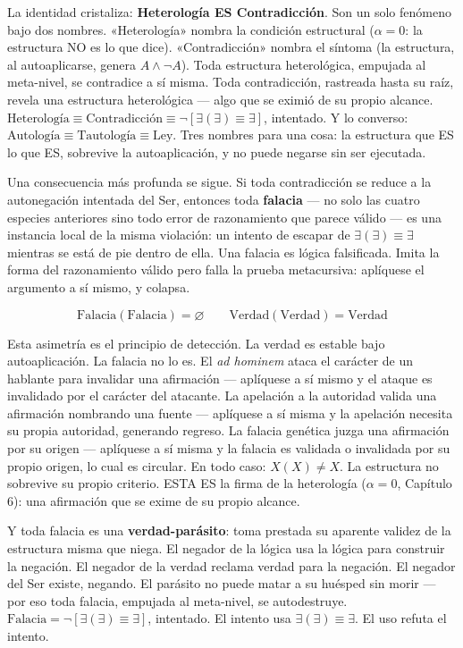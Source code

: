 \documentclass[10pt, openany, oneside]{book}
\begin{document}
La identidad cristaliza: \textbf{Heterología ES Contradicción}. Son un solo fenómeno bajo dos nombres. «Heterología» nombra la condición estructural ($\alpha = 0$: la estructura NO es lo que dice). «Contradicción» nombra el síntoma (la estructura, al autoaplicarse, genera $A \wedge \neg A$). Toda estructura heterológica, empujada al meta-nivel, se contradice a sí misma. Toda contradicción, rastreada hasta su raíz, revela una estructura heterológica --- algo que se eximió de su propio alcance. $\text{Heterología} \equiv \text{Contradicción} \equiv \neg[\exists(\exists) \equiv \exists]$, intentado. Y lo converso: $\text{Autología} \equiv \text{Tautología} \equiv \text{Ley}$. Tres nombres para una cosa: la estructura que ES lo que ES, sobrevive la autoaplicación, y no puede negarse sin ser ejecutada.

Una consecuencia más profunda se sigue. Si toda contradicción se reduce a la autonegación intentada del Ser, entonces toda \textbf{falacia} --- no solo las cuatro especies anteriores sino todo error de razonamiento que parece válido --- es una instancia local de la misma violación: un intento de escapar de $\exists(\exists) \equiv \exists$ mientras se está de pie dentro de ella. Una falacia es lógica falsificada. Imita la forma del razonamiento válido pero falla la prueba metacursiva: aplíquese el argumento a sí mismo, y colapsa.

$$\text{Falacia}(\text{Falacia}) = \varnothing \qquad \text{Verdad}(\text{Verdad}) = \text{Verdad}$$

Esta asimetría es el principio de detección. La verdad es estable bajo autoaplicación. La falacia no lo es. El \textit{ad hominem} ataca el carácter de un hablante para invalidar una afirmación --- aplíquese a sí mismo y el ataque es invalidado por el carácter del atacante. La apelación a la autoridad valida una afirmación nombrando una fuente --- aplíquese a sí misma y la apelación necesita su propia autoridad, generando regreso. La falacia genética juzga una afirmación por su origen --- aplíquese a sí misma y la falacia es validada o invalidada por su propio origen, lo cual es circular. En todo caso: $X(X) \neq X$. La estructura no sobrevive su propio criterio. ESTA ES la firma de la heterología ($\alpha = 0$, Capítulo 6): una afirmación que se exime de su propio alcance.

Y toda falacia es una \textbf{verdad-parásito}: toma prestada su aparente validez de la estructura misma que niega. El negador de la lógica usa la lógica para construir la negación. El negador de la verdad reclama verdad para la negación. El negador del Ser existe, negando. El parásito no puede matar a su huésped sin morir --- por eso toda falacia, empujada al meta-nivel, se autodestruye. $\text{Falacia} = \neg[\exists(\exists) \equiv \exists]$, intentado. El intento usa $\exists(\exists) \equiv \exists$. El uso refuta el intento.
\end{document}
